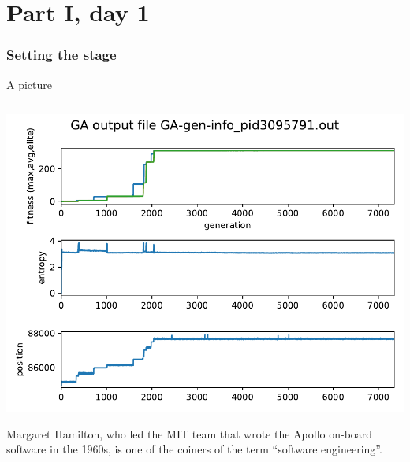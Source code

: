 \documentclass[10pt,aspectratio=169]{beamer}
\begin{document}
\part{Part I, day 1}

\section{Setting the stage}

\begin{frame}{A picture}
  \begin{columns} %
    \begin{column}{0.4\textwidth}
      \includegraphics[width=\textwidth]{GA-gen-info_pid3095791.out.pdf}
                      {\tiny Margaret Hamilton, who led the MIT
                        team that wrote the Apollo on-board
                        software in the 1960s, is one of the
                        coiners of the term ``software
                        engineering''.\par}
    \end{column}
    
    \pause


\end{columns}
\end{frame}
\end{document}
